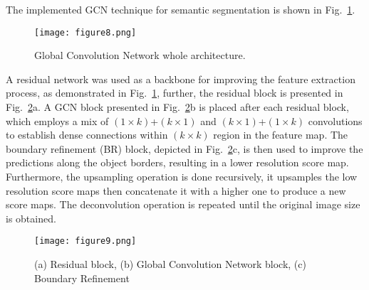 The implemented GCN technique for semantic segmentation is shown in Fig.~\ref{fig:gcn}.
\begin{figure} [h!]
	\begin{center}
		\texttt{[image: figure8.png]}
	\end{center}
	\caption{Global Convolution Network whole architecture.} 
	\label{fig:gcn}
\end{figure}

A residual network was used as a backbone for improving the feature extraction process, as demonstrated in Fig.~\ref{fig:gcn}, further, the residual block is presented in Fig.~\ref{fig:res_gcn_br}a.
A GCN block presented in Fig.~\ref{fig:res_gcn_br}b is placed after each residual block, which employs a mix of \((1\times k)\)+\((k\times 1)\) and \((k\times 1)\)+\((1\times k)\) convolutions to establish dense connections within \((k\times k)\) region in the feature map.
The boundary refinement (BR) block, depicted in Fig.~\ref{fig:res_gcn_br}c, is then used to improve the predictions along the object borders, resulting in a lower resolution score map.
Furthermore, the upsampling operation is done recursively, it upsamples the low 
resolution score maps then concatenate it with a higher one to produce a new 
score maps.
The deconvolution operation is repeated until the original image size is 
obtained.
\begin{figure} [h!]
	\begin{center}
		\texttt{[image: figure9.png]}
	\end{center}
	\caption{(a) Residual block, (b) Global Convolution Network block, (c) 
		Boundary Refinement} 
	\label{fig:res_gcn_br}
\end{figure}